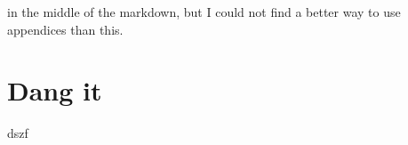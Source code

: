 \documentclass[oneside,phd,]{snuthesis}
\begin{document}
in the middle of the markdown, but I could not find a better way to use
appendices than this.

\chapter{Dang it}\label{dang-it}

dszf







\begin{abstractalt}

\end{abstractalt}

\acknowledgement

\end{document}
